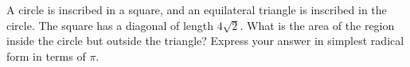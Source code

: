 A circle is inscribed in a square, and an equilateral triangle is inscribed in the circle. The square has a diagonal of length $4\sqrt2$. What is the area of the region inside the circle but outside the triangle? Express your answer in simplest radical form in terms of $\pi$.
